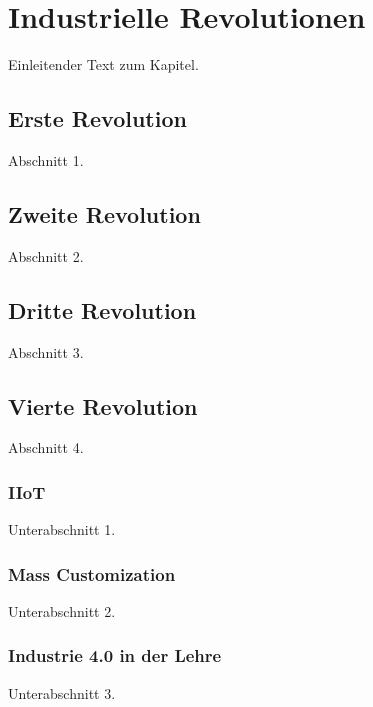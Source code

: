 \chapter{Industrielle Revolutionen\label{chap2:Zweites-Kapitel}}

Einleitender Text zum Kapitel.



\section{Erste Revolution\label{sec2.1:Unterpunkt-1}}

Abschnitt 1.

\section{Zweite Revolution\label{sec2.2:Unterpunkt-2}}

Abschnitt 2.

\section{Dritte Revolution\label{sec2.3:Unterpunkt-3}}

Abschnitt 3.

\section{Vierte Revolution\label{sec2.4:Unterpunkt-4}}

Abschnitt 4.

\subsection{IIoT\label{sub2.4.1:Unterpunkt-1}}

Unterabschnitt 1.

\subsection{Mass Customization\label{sub2.4.2:Unterpunkt-2}}

Unterabschnitt 2.

\subsection{\glqq Industrie 4.0\grqq{} in der Lehre\label{sub2.4.3:Unterpunkt-3}}

Unterabschnitt 3.